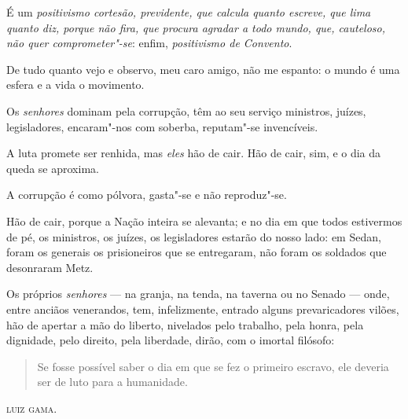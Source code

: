 É um \emph{positivismo cortesão, previdente, que calcula quanto escreve,
que lima quanto diz, porque não fira, que procura agradar a todo mundo,
que, cauteloso, não quer comprometer"-se}: enfim, \emph{positivismo de
Convento}.

De tudo quanto vejo e observo, meu caro amigo, não me espanto: o mundo é
uma esfera e a vida o movimento.

Os \emph{senhores} dominam pela corrupção, têm ao seu serviço ministros,
juízes, legisladores, encaram"-nos com soberba, reputam"-se invencíveis.

A luta promete ser renhida, mas \emph{eles} hão de cair. Hão de cair,
sim, e o dia da queda se aproxima.

A corrupção é como pólvora, gasta"-se e não reproduz"-se.

Hão de cair, porque a Nação inteira se alevanta; e no dia em que todos
estivermos de pé, os ministros, os juízes, os legisladores estarão do
nosso lado: em Sedan, foram os generais os prisioneiros que se
entregaram, não foram os soldados que desonraram Metz.

Os próprios \emph{senhores} --- na granja, na tenda, na taverna ou no
Senado --- onde, entre anciãos venerandos, tem, infelizmente, entrado
alguns prevaricadores vilões, hão de apertar a mão do liberto, nivelados
pelo trabalho, pela honra, pela dignidade, pelo direito, pela liberdade,
dirão, com o imortal filósofo:

\begin{quote}Se fosse possível saber o dia em que se fez o primeiro escravo,
ele deveria ser de luto para a humanidade.
\end{quote}

\bigskip

\hfill\textsc{luiz gama.}

\paginabranca
\mbox{}\vfill
\thispagestyle{empty}

